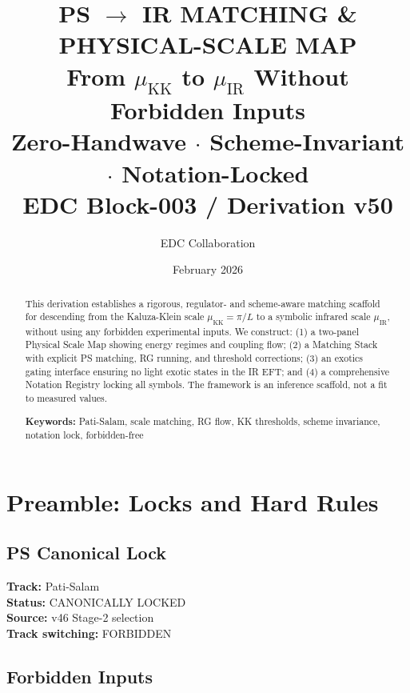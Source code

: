 \documentclass[11pt,a4paper]{article}
\title{\textbf{PS $\to$ IR MATCHING \& PHYSICAL-SCALE MAP}\\[0.5em]
\large From $\mu_{\text{KK}}$ to $\mu_{\text{IR}}$ Without Forbidden Inputs\\[0.5em]
\small Zero-Handwave $\cdot$ Scheme-Invariant $\cdot$ Notation-Locked\\[0.5em]
\normalsize EDC Block-003 / Derivation v50}
\author{EDC Collaboration}
\date{February 2026}
\begin{document}
\maketitle

\begin{abstract}
This derivation establishes a rigorous, regulator- and scheme-aware matching scaffold
for descending from the Kaluza-Klein scale $\mu_{\text{KK}} = \pi/L$ to a symbolic
infrared scale $\mu_{\text{IR}}$, without using any forbidden experimental inputs.
We construct: (1) a two-panel Physical Scale Map showing energy regimes and coupling
flow; (2) a Matching Stack with explicit PS matching, RG running, and threshold
corrections; (3) an exotics gating interface ensuring no light exotic states in the
IR EFT; and (4) a comprehensive Notation Registry locking all symbols. The framework
is an inference scaffold, not a fit to measured values.

\textbf{Keywords:} Pati-Salam, scale matching, RG flow, KK thresholds, scheme invariance,
notation lock, forbidden-free
\end{abstract}

\tableofcontents
\newpage

\section{Preamble: Locks and Hard Rules}
\label{sec:preamble}

\subsection{PS Canonical Lock}
\label{subsec:ps-lock}

\begin{tcolorbox}[colback=blue!5!white,colframe=blue!60!black,title=\textbf{PS CANONICAL LOCK}]
\textbf{Track:} Pati-Salam \\
\textbf{Status:} CANONICALLY LOCKED \\
\textbf{Source:} v46 Stage-2 selection \\
\textbf{Track switching:} FORBIDDEN
\end{tcolorbox}

\subsection{Forbidden Inputs}
\label{subsec:forbidden}
\end{document}
